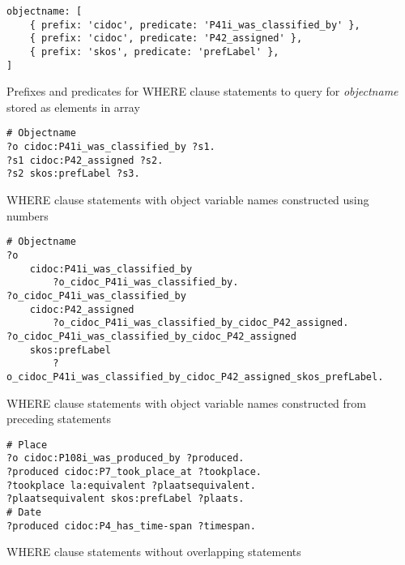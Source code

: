 %
\begin{listing}[htbp]
    \begin{verbatim}
objectname: [
    { prefix: 'cidoc', predicate: 'P41i_was_classified_by' },
    { prefix: 'cidoc', predicate: 'P42_assigned' },
    { prefix: 'skos', predicate: 'prefLabel' },
]
    \end{verbatim}
    \caption{Prefixes and predicates for WHERE clause statements to query for \textit{objectname} stored as elements in array}
    \label{lst:where_statements_array_predicates}
\end{listing}
%
\begin{listing}[htbp]
    \begin{verbatim}
# Objectname
?o cidoc:P41i_was_classified_by ?s1.
?s1 cidoc:P42_assigned ?s2.
?s2 skos:prefLabel ?s3.
    \end{verbatim}
    \caption{WHERE clause statements with object variable names constructed using numbers}
    \label{lst:where_statements_objects_numbers}
\end{listing}
\begin{listing}[htbp]
    \begin{verbatim}
# Objectname
?o
    cidoc:P41i_was_classified_by
        ?o_cidoc_P41i_was_classified_by.
?o_cidoc_P41i_was_classified_by
    cidoc:P42_assigned
        ?o_cidoc_P41i_was_classified_by_cidoc_P42_assigned.
?o_cidoc_P41i_was_classified_by_cidoc_P42_assigned
    skos:prefLabel
        ?o_cidoc_P41i_was_classified_by_cidoc_P42_assigned_skos_prefLabel.
    \end{verbatim}
    \caption{WHERE clause statements with object variable names constructed from preceding statements}
    \label{lst:where_statements_objects_long}
\end{listing}
%
\begin{listing}[htbp]
    \begin{verbatim}
# Place
?o cidoc:P108i_was_produced_by ?produced.
?produced cidoc:P7_took_place_at ?tookplace.
?tookplace la:equivalent ?plaatsequivalent.
?plaatsequivalent skos:prefLabel ?plaats.
# Date
?produced cidoc:P4_has_time-span ?timespan.
    \end{verbatim}
    \caption{WHERE clause statements without overlapping statements}
    \label{lst:where_statements_no_overlapping}
\end{listing}
